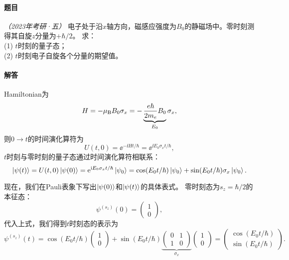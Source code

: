 \begin{tcolorbox}[breakable, title={\textbf{例题}}]
    \paragraph{题目} \textit{（2023年考研·五）}
    电子处于沿$x$轴方向，磁感应强度为$B_0$的静磁场中。零时刻测得其自旋$z$分量为$+\hbar/2$。
    求：\\
    (1) $t$时刻的量子态；\\
    (2) $t$时刻电子自旋各个分量的期望值。

    \paragraph{解答}
    Hamiltonian为
    \begin{equation}
        H = -\mu_{\rm{B}} B_0 \sigma_x = - \underbrace{\frac{e\hbar}{2m_e} B_0}_{E_0} \sigma_x,
    \end{equation}
    则$0\rightarrow t$的时间演化算符为
    \begin{equation}
        U(t,0) = \ee^{-\ii H t/\hbar} = \ee^{\ii E_0 \sigma_x t/\hbar},
    \end{equation}
    $t$时刻与零时刻的量子态通过时间演化算符相联系：
    \begin{equation}
        \ket{\psi(t)} = U(t,0) \ket{\psi(0)} = \ee^{\ii E_0 \sigma_x t/\hbar} \ket{\psi_0}
        = \cos(E_0 t/\hbar)\ket{\psi_0} + \sin(E_0 t/\hbar) \sigma_x \ket{\psi_0}.
    \end{equation}

    现在，我们在Pauli表象下写出$\ket{\psi(0)}$和$\ket{\psi(t)}$的具体表式。
    零时刻态为$s_z=\hbar/2$的本征态：
    \begin{equation}
        \psi^{(s_z)}(0) = \begin{pmatrix} 1 \\ 0 \end{pmatrix},
    \end{equation}
    代入上式，我们得到$t$时刻态的表示为
    \begin{equation}
        \psi^{(s_z)}(t) = \cos(E_0 t/\hbar)\begin{pmatrix} 1 \\ 0 \end{pmatrix} + \sin(E_0 t/\hbar) \underbrace{\begin{pmatrix} 0 & 1 \\ 1 & 0 \end{pmatrix}}_{\sigma_x} \begin{pmatrix} 1 \\ 0 \end{pmatrix}
        = \begin{pmatrix} \cos(E_0 t/\hbar) \\ \sin(E_0 t/\hbar) \end{pmatrix}.
    \end{equation}


\end{tcolorbox}
